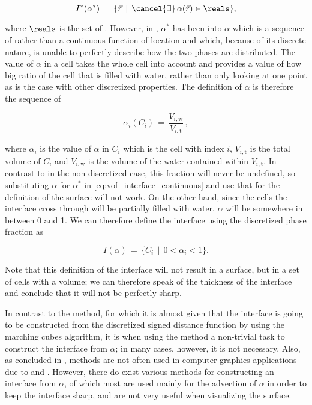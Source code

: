 \begin{equation} \label{eq:vof_interface_continuous}
I^*(\alpha^*) \,=\, \{\vec{r} \,\mid\, \cancel{\exists}\,\alpha(\vec{r})\in\reals\},
\end{equation}

where $\reals$ is the set of . However, in \thisprojectwork, $\alpha^*$ has been \discretized into $\alpha$ which is a sequence of  rather than a continuous function of location and which, because of its discrete nature, is unable to perfectly describe how the two phases are distributed. The value of $\alpha$ in a cell takes the whole cell into account and provides a value of how big ratio of the cell that is filled with water, rather than only looking at one point as is the case with other discretized properties. The definition of $\alpha$ is therefore the sequence of

\begin{equation} \label{eq:phase_fraction_discretized}
\alpha_i(C_i) \,=\, \frac{V_{i,\text{w}}}{V_{i,\text{t}}}\,,
\end{equation}

where $\alpha_i$ is the value of $\alpha$ in $C_i$ which is the cell with index $i$, $V_{i,\text{t}}$ is the total volume of $C_i$ and $V_{i,\text{w}}$ is the volume of the water contained within $V_{i,\text{t}}$. In contrast to in the non-discretized case, this fraction will never be undefined, so substituting $\alpha$ for $\alpha^*$ in \eqref{eq:vof_interface_continuous} and use that for the definition of the surface will not work. On the other hand, since the cells the interface cross through will be partially filled with water, $\alpha$ will be somewhere in between 0 and 1. We can therefore define the interface using the discretized phase fraction as

\begin{equation} \label{eq:vof_interface_discrete}
I(\alpha) \,=\, \{C_i \,\mid\, 0 < \alpha_i < 1\}.
\end{equation}

Note that this definition of the interface will not result in a surface, but in a set of cells with a volume; we can therefore speak of the thickness of the interface and conclude that it will not be perfectly sharp.

In contrast to the \LS method, for which it is almost given that the interface is going to be constructed from the discretized signed distance function by using the marching cubes algorithm, it is when using the \VOF method a non-trivial task to construct the interface from $\alpha$; in many cases, however, it is not necessary. Also, as concluded in \citep{Wojtan2009}, \VOF methods are not often used in computer graphics applications due to  and . However, there do exist various methods for constructing an interface from $\alpha$, of which most are used mainly for the advection of $\alpha$ in order to keep the interface sharp, and are not very useful when visualizing the surface.

